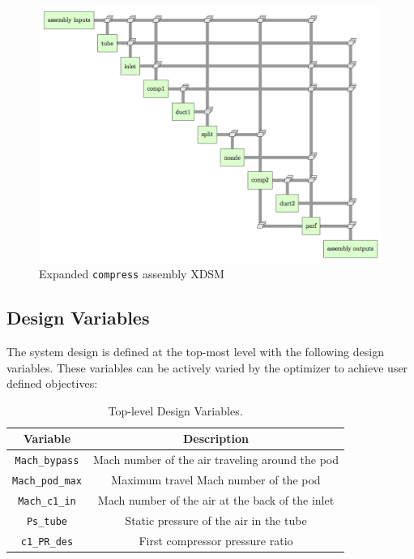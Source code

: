 \documentclass[heading.tex]{subfiles}
\begin{document}
\begin{figure}[hbtp]
\centering
\includegraphics[width=\textwidth]{images/compress_assembly_xdsm.png}
\caption{Expanded \texttt{compress} assembly XDSM}
\label{f:compressorXDSM}
\end{figure}

\subsection{Design Variables}
The system design is defined at the top-most level with the following design variables. These variables can be actively varied
 by the optimizer to achieve user defined objectives:

\begin{table} [H]
\centering
\begin{tabular}{|c|c|}
\hline 
Variable & Description\\ 
\hline 
\texttt{Mach\_bypass} & Mach number of the air traveling around the pod \\ 
\hline 
\texttt{Mach\_pod\_max} & Maximum travel Mach number of the pod \\ 
\hline 
\texttt{Mach\_c1\_in} & Mach number of the air at the back of the inlet \\ 
\hline 
\texttt{Ps\_tube} & Static pressure of the air in the tube \\ 
\hline 
\texttt{c1\_PR\_des} & First compressor pressure ratio \\ 
\hline 
\end{tabular}
 \caption[Design Variables]{Top-level Design Variables.}
\end{table}
\end{document}
